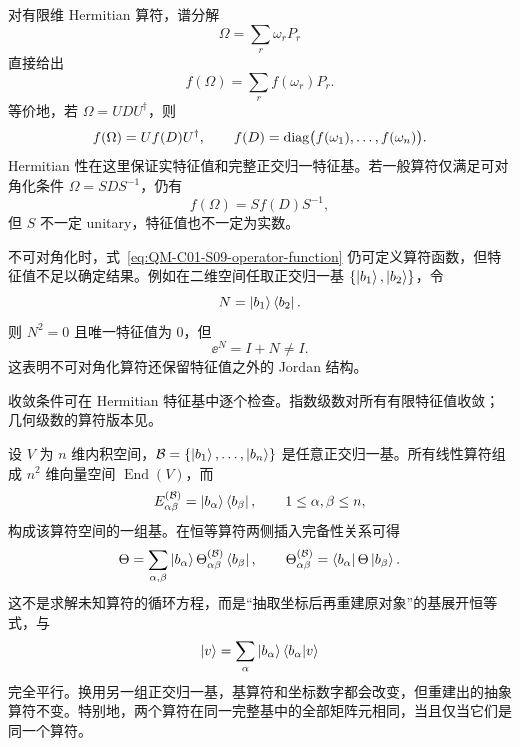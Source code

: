 对有限维 Hermitian 算符，谱分解
\[
  \Omega=\sum_r\omega_rP_r
\]
直接给出
\begin{equation}
  f(\Omega)=\sum_rf(\omega_r)P_r.
  \label{eq:QM-C01-S09-spectral-function}
\end{equation}
等价地，若 $\Omega=UDU^\dagger$，则
\[
  f(\Omega)=Uf(D)U^\dagger,
  \qquad
  f(D)=\operatorname{diag}\bigl(f(\omega_1),\ldots,f(\omega_n)\bigr).
\]
Hermitian 性在这里保证实特征值和完整正交归一特征基。若一般算符仅满足可对角化条件 $\Omega=SDS^{-1}$，仍有
\begin{equation}
  f(\Omega)=Sf(D)S^{-1},
  \label{eq:QM-C01-S09-diagonalizable-function}
\end{equation}
但 $S$ 不一定 unitary，特征值也不一定为实数。

不可对角化时，式~\eqref{eq:QM-C01-S09-operator-function} 仍可定义算符函数，但特征值不足以确定结果。例如在二维空间任取正交归一基 $\{\left|b_1\right\rangle,\left|b_2\right\rangle\}$，令
\[
  N=\left|b_1\right\rangle\left\langle b_2\right|.
\]
则 $N^2=0$ 且唯一特征值为 $0$，但
\[
  \ee^N=I+N\neq I.
\]
这表明不可对角化算符还保留特征值之外的 Jordan 结构。

收敛条件可在 Hermitian 特征基中逐个检查。指数级数对所有有限特征值收敛；几何级数的算符版本见。


设 $V$ 为 $n$ 维内积空间，$\mathcal B=\{\left|b_1\right\rangle,\ldots,\left|b_n\right\rangle\}$ 是任意正交归一基。所有线性算符组成 $n^2$ 维向量空间 $\operatorname{End}(V)$，而
\[
  E_{\alpha\beta}^{(\mathcal B)}
  =\left|b_\alpha\right\rangle\left\langle b_\beta\right|,
  \qquad 1\leq\alpha,\beta\leq n,
\]
构成该算符空间的一组基。在恒等算符两侧插入完备性关系可得
\begin{equation}
  \Theta
  =\sum_{\alpha,\beta}
  \left|b_\alpha\right\rangle
  \Theta_{\alpha\beta}^{(\mathcal B)}
  \left\langle b_\beta\right|,
  \qquad
  \Theta_{\alpha\beta}^{(\mathcal B)}
  =\left\langle b_\alpha\right|\Theta\left|b_\beta\right\rangle.
  \label{eq:QM-C01-S09-operator-space-coordinates}
\end{equation}
这不是求解未知算符的循环方程，而是“抽取坐标后再重建原对象”的基展开恒等式，与
\[
  \left|v\right\rangle=\sum_\alpha\left|b_\alpha\right\rangle\left\langle b_\alpha \middle| v \right\rangle
\]
完全平行。换用另一组正交归一基，基算符和坐标数字都会改变，但重建出的抽象算符不变。特别地，两个算符在同一完整基中的全部矩阵元相同，当且仅当它们是同一个算符。



